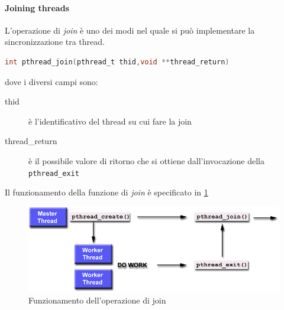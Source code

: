 \paragraph{Joining threads}
L'operazione di \emph{join} è uno dei modi nel quale si può implementare la sincronizzazione tra thread.
\begin{lstlisting}[language=C]
int pthread_join(pthread_t thid,void **thread_return)
\end{lstlisting}
dove i diversi campi sono:
\begin{description}
\item[thid] è l'identificativo del thread su cui fare la join
\item[thread\_return] è il possibile valore di ritorno che si ottiene dall'invocazione della \texttt{pthread\_exit}
\end{description}
Il funzionamento della funzione di \emph{join} è specificato in \figurename \ref{fig:join}
\begin{figure}[htb]
\centering
\includegraphics[scale=0.7]{img/join.png}
\caption{Funzionamento dell'operazione di join}\label{fig:join}
\end{figure}
